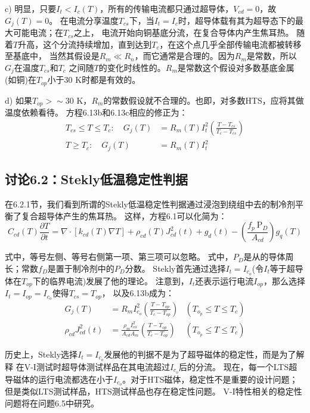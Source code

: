 c) 明显，只要$I_t<I_c(T)$，所有的传输电流都只通过超导体，$V_{cd}=0$，故$G_j(T)=0$。
在电流分享温度$T_{cs}$下，当$I_t=I_c$时，超导体载有其为超导态下的最大可能电流；在$T_{cs}$之上，
电流开始向铜基底分流，在复合导体内产生焦耳热。
随着$T$升高，这个分流持续增加，直到达到$T_c$，在这个点几乎全部传输电流都被转移至基底中，
当然其假设是$R_m\ll R_n$，而它通常是合理的。因为$R_m$是常数，所以$G_j$在温度$T_{cs}$和$T_c$
之间随$T$的变化时线性的。$R_m$是常数这个假设对多数基底金属(如铜)在$T_{op}$小于30 K时都是有效的。

d) 如果$T_{op}>\sim 30$ K，$R_m$的常数假设就不合理的。也即，对多数HTS，应将其做温度依赖看待。
方程6.13b和6.13c相应的修正为：
\begin{subequations}
	\begin{align}
	T_{cs}\leq T\leq T_c:\quad G_j(T)&=R_m(T)I_t^2(\frac{T-T_{cs}}{T_c-T_{cs}})\\
	T\ge T_c:\quad G_j(T)&=R_m(T)I_t^2
	\end{align}
\end{subequations}


\subsection{讨论6.2：Stekly低温稳定性判据}
在6.2.1节，我们看到所谓的Stekly低温稳定性判据通过浸泡到绕组中去的制冷剂平衡了复合超导体产生的焦耳热。
这样，方程6.1可以化简为：
\begin{equation}%
C_{cd}(T)\frac {\partial T}{\partial t}=\nabla\cdot[k_{cd}(T)\nabla T]+\rho _{cd}(T)J_{cd}^2(t)+g_d(t)-(\frac{f_p\ \mathrm{P}_D}{A_{cd}})g_q(T)
\end{equation}

式中，等号左侧、等号右侧第一项、第三项可以忽略。
式中，$P_D$是从的导体周长；常数$f_D$是置于制冷剂中的$P_D$分数。
Stekly首先通过选择$I_t=I_{c_o}$(令$I_t$等于超导体在$T_{op}$下的临界电流)发展了他的理论。
注意到，$I_t$还表示运行电流$I_{op}$，那么选择$I_t=I_{op}=I_{c_o}$使得$T_{cs}=T_{op}$，
以及6.13b成为：
\begin{subequations}
	\begin{align}
	G_j(T)&=R_mI_{c_o}^2(\frac{T-T_{op}}{T_c-T_{op}}) &(T_{o_p}\leq T \leq T_c)\\
	\rho_{cd}J^2_{cd}(t)&=\frac{\rho_{m}I_{co}^2}{A_{cd}A_m}
	(\frac{T-T_{op}}{T_c-T_{op}}) &(T_{o_p}\leq T \leq T_c)
	\end{align}
\end{subequations}

历史上，Stekly选择$I_t=I_{c_o}$发展他的判据不是为了超导磁体的稳定性，而是为了解释
在V-I测试时超导体测试样品在其电流超过$I_{c_o}$后的分流。
现在，每一个LTS超导磁体的运行电流都选在小于$I_{c_o}$。对于HTS磁体，稳定性不是重要的设计问题；
但是类似LTS测试样品，HTS测试样品也存在稳定性问题。
V-I特性相关的稳定性问题将在问题6.5中研究。

